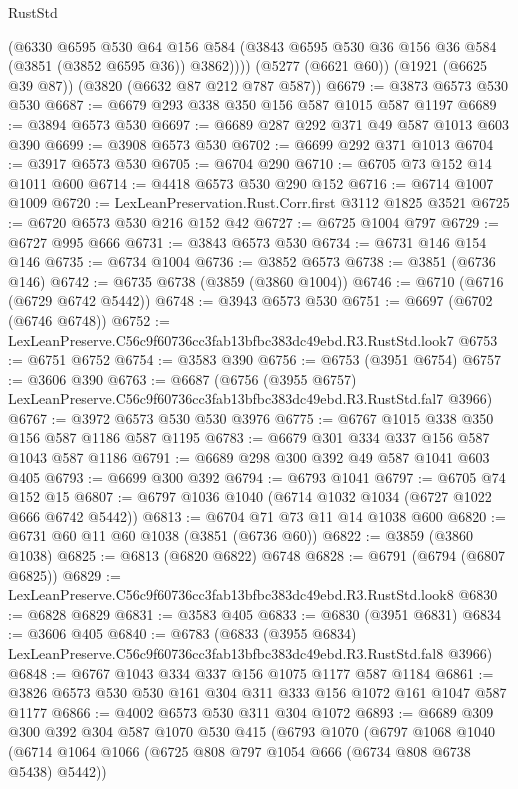 \begin{lexlean}{RustStd}
\begin{coremodule}
        (@6330
          @6595
          @530
          @64
          @156
          @584
          (@3843 @6595 @530 @36 @156 @36 @584 (@3851 (@3852 @6595 @36)) @3862))))
    (@5277 (@6621 @60))
    (@1921 (@6625 @39 @87))
    (@3820 (@6632 @87 @212 @787 @587))
@6679 := @3873 @6573 @530 @530
@6687 := @6679 @293 @338 @350 @156 @587 @1015 @587 @1197
@6689 := @3894 @6573 @530
@6697 := @6689 @287 @292 @371 @49 @587 @1013 @603 @390
@6699 := @3908 @6573 @530
@6702 := @6699 @292 @371 @1013
@6704 := @3917 @6573 @530
@6705 := @6704 @290
@6710 := @6705 @73 @152 @14 @1011 @600
@6714 := @4418 @6573 @530 @290 @152
@6716 := @6714 @1007 @1009
@6720 := LexLeanPreservation.Rust.Corr.first @3112 @1825 @3521
@6725 := @6720 @6573 @530 @216 @152 @42
@6727 := @6725 @1004 @797
@6729 := @6727 @995 @666
@6731 := @3843 @6573 @530
@6734 := @6731 @146 @154 @146
@6735 := @6734 @1004
@6736 := @3852 @6573
@6738 := @3851 (@6736 @146)
@6742 := @6735 @6738 (@3859 (@3860 @1004))
@6746 := @6710 (@6716 (@6729 @6742 @5442))
@6748 := @3943 @6573 @530
@6751 := @6697 (@6702 (@6746 @6748))
@6752 := LexLeanPreserve.C56c9f60736cc3fab13bfbc383dc49ebd.R3.RustStd.look7
@6753 := @6751 @6752
@6754 := @3583 @390
@6756 := @6753 (@3951 @6754)
@6757 := @3606 @390
@6763 := @6687
    (@6756 (@3955 @6757) LexLeanPreserve.C56c9f60736cc3fab13bfbc383dc49ebd.R3.RustStd.fal7 @3966)
@6767 := @3972 @6573 @530 @530 @3976
@6775 := @6767 @1015 @338 @350 @156 @587 @1186 @587 @1195
@6783 := @6679 @301 @334 @337 @156 @587 @1043 @587 @1186
@6791 := @6689 @298 @300 @392 @49 @587 @1041 @603 @405
@6793 := @6699 @300 @392
@6794 := @6793 @1041
@6797 := @6705 @74 @152 @15
@6807 := @6797 @1036 @1040 (@6714 @1032 @1034 (@6727 @1022 @666 @6742 @5442))
@6813 := @6704 @71 @73 @11 @14 @1038 @600
@6820 := @6731 @60 @11 @60 @1038 (@3851 (@6736 @60))
@6822 := @3859 (@3860 @1038)
@6825 := @6813 (@6820 @6822) @6748
@6828 := @6791 (@6794 (@6807 @6825))
@6829 := LexLeanPreserve.C56c9f60736cc3fab13bfbc383dc49ebd.R3.RustStd.look8
@6830 := @6828 @6829
@6831 := @3583 @405
@6833 := @6830 (@3951 @6831)
@6834 := @3606 @405
@6840 := @6783
    (@6833 (@3955 @6834) LexLeanPreserve.C56c9f60736cc3fab13bfbc383dc49ebd.R3.RustStd.fal8 @3966)
@6848 := @6767 @1043 @334 @337 @156 @1075 @1177 @587 @1184
@6861 := @3826 @6573 @530 @530 @161 @304 @311 @333 @156 @1072 @161 @1047 @587 @1177
@6866 := @4002 @6573 @530 @311 @304 @1072
@6893 := @6689
    @309
    @300
    @392
    @304
    @587
    @1070
    @530
    @415
    (@6793
      @1070
      (@6797
        @1068
        @1040
        (@6714 @1064 @1066 (@6725 @808 @797 @1054 @666 (@6734 @808 @6738 @5438) @5442))

\end{coremodule}
\end{lexlean}
